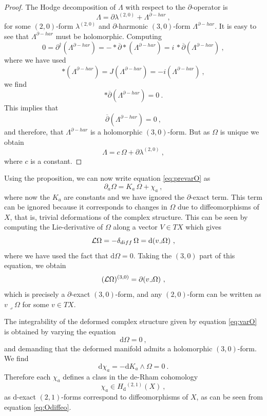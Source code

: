 \documentclass[12pt,a4paper]{article}
\def\bar#1{\overline{#1}}
\let\p=\partial
\def\d{\textrm{d}}
\def\bp{\bar{\partial}}
\theoremstyle{definition}
\begin{document}
\begin{proof}
The Hodge decomposition of $\Lambda$ with respect to the $\p$-operator is
\[ \Lambda = \p\lambda^{(2,0)} + \Lambda^{\p-har}~,\]
for some $(2,0)$-form $\lambda^{(2,0)}$ and $\p$-harmonic $(3,0)$-form $\Lambda^{\p-har}$. It is easy to see that $\Lambda^{\p-har}$ must be holomorphic.  Computing
\[ 0 = \p^\dagger(\Lambda^{\p-har}) = - * \bp * (\Lambda^{\p-har})
= i\, * \bp (\Lambda^{\p-har}) ~,\]
where we have used 
\[ * (\Lambda^{\p-har}) = J(\Lambda^{\p-har}) = -i  (\Lambda^{\p-har})~,\]
we find 
\[ * \bp (\Lambda^{\p-har}) = 0~.\]
This implies that
\[ \bp (\Lambda^{\p-har}) = 0~,\]
and therefore, that $\Lambda^{\p-har}$ is a holomorphic $(3,0)$-form.  But as $\Omega$ is unique
we obtain
\[\Lambda = c\, \Omega + \p\lambda^{(2,0)}~,\]
where $c$ is a constant.
\end{proof}
Using the proposition, we can now write equation \eqref{eq:prevarO} as
\begin{equation}
\partial_a \Omega = K_a\, \Omega + \chi_a~,\label{eq:varO}
\end{equation}
where now the $K_a$ are constants and we have ignored the $\p$-exact term.  This term can be ignored because it corresponds to changes in $\Omega$ due to diffeomorphisms of $X$, that is, trivial deformations of the complex structure.  This can be seen by computing the  Lie-derivative of $\Omega$ along a vector $V\in TX$ which gives
\begin{equation}
{\cal L}\Omega = -\delta_{diff}\,\Omega = \d(v\lrcorner\Omega)~,\label{eq:Odiffeo}
\end{equation}
where we have used the fact that $\d\Omega= 0$.
Taking the $(3,0)$ part of this equation, we obtain
\[ ({\cal L}\Omega)^{(3,0)} = \p(v\lrcorner\Omega)~,\]
which is precisely a $\p$-exact $(3,0)$-form, and any $(2,0)$-form can be written as $v\lrcorner\Omega$
for some $v\in TX$.

The integrability of the deformed complex structure given by equation \eqref{eq:varO} is obtained by 
varying the equation
\[\d \Omega = 0~,\]
and demanding that the deformed manifold admits a holomorphic $(3,0)$-form.  We find
\begin{equation}
 \d\chi_a = - \d K_a\wedge\Omega = 0~.
 \label{eq:dchi}
 \end{equation}
 Therefore  each $\chi_a$ defines a class in the de-Rham cohomology
 \[ \chi_a \in H_{\d}{}^{(2,1)}(X)~,\]
as $\d$-exact $(2,1)$-forms correspond to 
diffeomorphisms of $X$, as can be seen from equation \eqref{eq:Odiffeo}.
\end{document}
